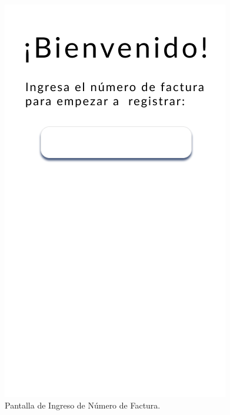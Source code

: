\documentclass{scrreprt}
\begin{document}
    \begin{figure}[!htpb]
        \centerline{\includegraphics[scale=.35]{images/prototype/mobile/iPhone 8 - 2.png}}
        \caption{Pantalla de Ingreso de Número de Factura.}
        \label{fig}
    \end{figure}
    \FloatBarrier
\end{document}
